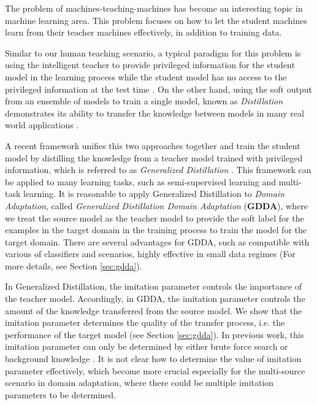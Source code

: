 The problem of machines-teaching-machines has become an interesting topic in machine learning area. This problem focuses on how to let the student machines learn from their teacher machines effectively, in addition to training data.

Similar to our human teaching scenario, a typical paradigm for this problem is using the intelligent teacher to provide privileged information for the student model in the learning process while the student model has no access to the privileged information at the test time \cite{vapnik2009new}\cite{vapnik2015learning}. On the other hand, using the soft output from an ensemble of models to train a single model, known as \textit{Distillation} demonstrates its ability to transfer the knowledge between models in many real world applications  \cite{Gupta_2016_CVPR}\cite{hinton2015distilling}\cite{luo2016face}\cite{Tzeng_2015_ICCV}\cite{urban2016deep}. 

A recent framework unifies this two approaches together and train the student model by distilling the knowledge from a teacher model trained with privileged information, which is referred to as \textit{Generalized Distillation} \cite{lopez2015unifying}. This framework can be applied to many learning tasks, such as semi-supervised learning and multi-task learning. It is reasonable to apply Generalized Distillation to \textit{Domain Adaptation}, called \textit{Generalized Distillation Domain Adaptation} (\textbf{GDDA}), where we treat the source model as the teacher model to provide the soft label for the examples in the target domain in the training process to train the model for the target domain.  
There are several advantages for GDDA,
such as compatible with various of classifiers and scenarios, highly effective in small data regimes (For more details, see Section \ref{sec:gdda}).

In Generalized Distillation, the imitation parameter controls the importance of the teacher model. Accordingly, in GDDA, the imitation parameter controls the amount of the knowledge transferred from the source model. We show that the imitation parameter determines the quality of the transfer process, i.e. the performance of the target model (see Section \ref{sec:gdda}). In previous work, this imitation parameter can only be determined  by either brute force search or background knowledge \cite{lopez2015unifying}\cite{Tzeng_2015_ICCV}. It is not clear how to determine the value of imitation parameter effectively, which become more crucial especially for the multi-source scenario in domain adaptation, where there could be multiple imitation parameters to be determined.


